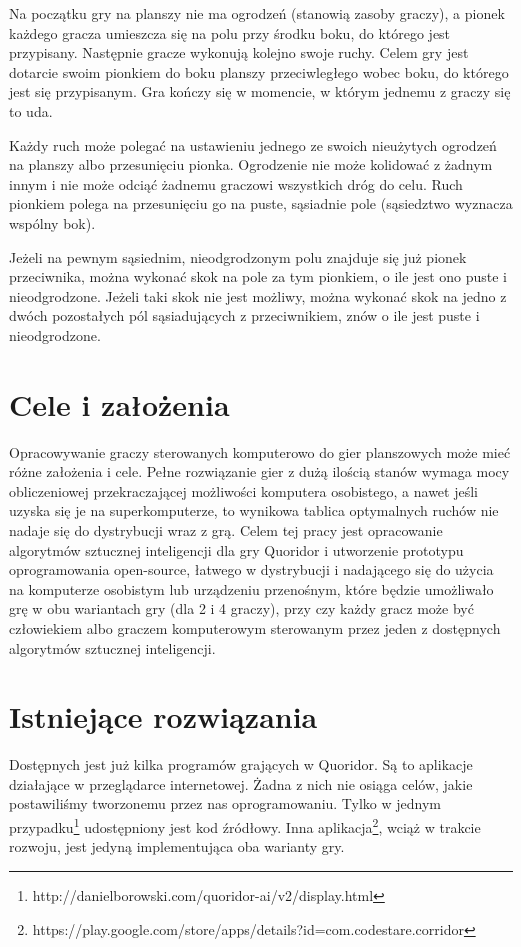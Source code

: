 \documentclass{pracamgr}
\begin{document}
Na początku gry na planszy nie ma ogrodzeń (stanowią zasoby graczy), a pionek każdego gracza umieszcza się na polu przy środku boku, do którego jest przypisany.
Następnie gracze wykonują kolejno swoje ruchy. Celem gry jest dotarcie swoim pionkiem do boku planszy przeciwległego wobec boku, do którego jest się przypisanym. Gra kończy się w momencie, w którym jednemu z graczy się to uda.

Każdy ruch może polegać na ustawieniu jednego ze swoich nieużytych ogrodzeń na planszy albo przesunięciu pionka. Ogrodzenie nie może kolidować z żadnym innym i nie może odciąć żadnemu graczowi wszystkich dróg do celu. Ruch pionkiem polega na przesunięciu go na puste, sąsiadnie pole (sąsiedztwo wyznacza wspólny bok).

Jeżeli na pewnym sąsiednim, nieodgrodzonym polu znajduje się już pionek przeciwnika, można wykonać skok na pole za tym pionkiem, o ile jest ono puste i nieodgrodzone. Jeżeli taki skok nie jest możliwy, można wykonać skok na jedno z dwóch pozostałych pól sąsiadujących z przeciwnikiem, znów o ile jest puste i nieodgrodzone.

\section{Cele i założenia}

Opracowywanie graczy sterowanych komputerowo do gier planszowych może mieć różne założenia i cele. Pełne rozwiązanie gier z dużą ilością stanów wymaga mocy obliczeniowej przekraczającej możliwości komputera osobistego, a nawet jeśli uzyska się je na superkomputerze, to wynikowa tablica optymalnych ruchów nie nadaje się do dystrybucji wraz z grą. Celem tej pracy jest opracowanie algorytmów sztucznej inteligencji dla gry Quoridor i utworzenie prototypu oprogramowania open-source, łatwego w dystrybucji i nadającego się do użycia na komputerze osobistym lub urządzeniu przenośnym, które będzie umożliwało grę w obu wariantach gry (dla 2 i 4 graczy), przy czy każdy gracz może być człowiekiem albo graczem komputerowym sterowanym przez jeden z dostępnych algorytmów sztucznej inteligencji.

\section{Istniejące rozwiązania}

Dostępnych jest już kilka programów grających w Quoridor. Są to aplikacje działające w przeglądarce internetowej. Żadna z nich nie osiąga celów, jakie postawiliśmy tworzonemu przez nas oprogramowaniu.
Tylko w jednym przypadku\footnote{http://danielborowski.com/quoridor-ai/v2/display.html} udostępniony jest kod źródłowy.
Inna aplikacja\footnote{https://play.google.com/store/apps/details?id=com.codestare.corridor}, wciąż w trakcie rozwoju, jest jedyną implementująca oba warianty gry.
\end{document}
